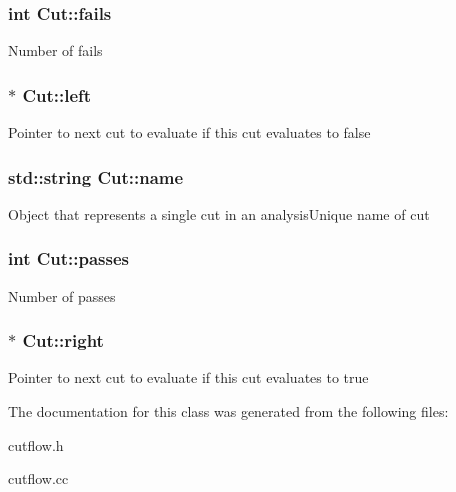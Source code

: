 \subsubsection[{\texorpdfstring{fails}{fails}}]{\setlength{\rightskip}{0pt plus 5cm}int Cut\+::fails}\hypertarget{classCut_a7bfcec46b8c2879a9660ac7656ed7b83}{}\label{classCut_a7bfcec46b8c2879a9660ac7656ed7b83}
Number of fails 
\subsubsection[{\texorpdfstring{left}{left}}]{$\ast$ Cut\+::left}\hypertarget{classCut_a2c65e372172dfa0f705d117d3ad0f668}{}\label{classCut_a2c65e372172dfa0f705d117d3ad0f668}
Pointer to next cut to evaluate if this cut evaluates to false 
\subsubsection[{\texorpdfstring{name}{name}}]{\setlength{\rightskip}{0pt plus 5cm}std\+::string Cut\+::name}\hypertarget{classCut_accf700d2d00746b97a265d4aea3f55c2}{}\label{classCut_accf700d2d00746b97a265d4aea3f55c2}
Object that represents a single cut in an analysis\+Unique name of cut 
\subsubsection[{\texorpdfstring{passes}{passes}}]{\setlength{\rightskip}{0pt plus 5cm}int Cut\+::passes}\hypertarget{classCut_a9ec802667c770787a473c622208ef35c}{}\label{classCut_a9ec802667c770787a473c622208ef35c}
Number of passes 
\subsubsection[{\texorpdfstring{right}{right}}]{$\ast$ Cut\+::right}\hypertarget{classCut_a2142ffe68028bb0c211408c0f5bb8bfb}{}\label{classCut_a2142ffe68028bb0c211408c0f5bb8bfb}
Pointer to next cut to evaluate if this cut evaluates to true 

The documentation for this class was generated from the following files\+:\begin{DoxyCompactItemize}
\item 
cutflow.\+h\item 
cutflow.\+cc\end{DoxyCompactItemize}
